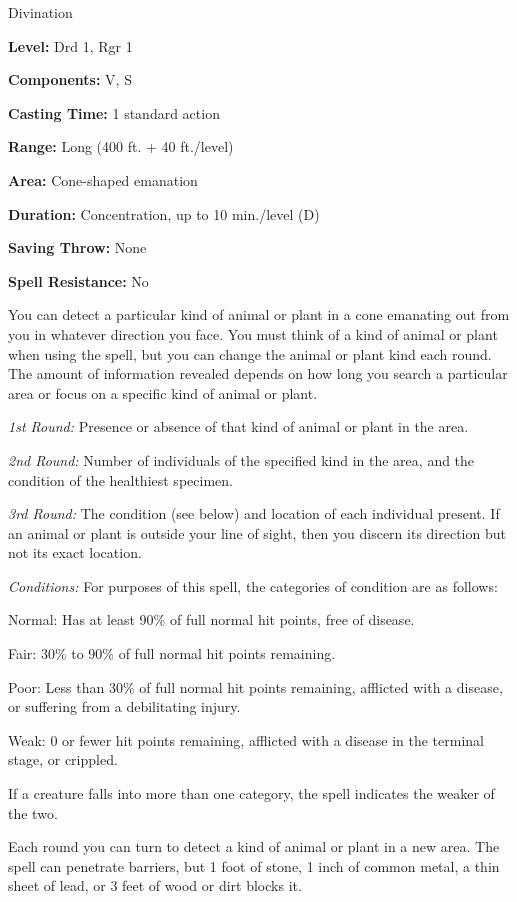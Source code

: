 
Divination

\textbf{Level:} Drd 1, Rgr 1

\textbf{Components:} V, S

\textbf{Casting Time:} 1 standard action

\textbf{Range:} Long (400 ft. + 40 ft./level)

\textbf{Area:} Cone-shaped emanation

\textbf{Duration:} Concentration, up to 10 min./level (D)

\textbf{Saving Throw:} None

\textbf{Spell Resistance:} No

You can detect a particular kind of animal or plant in a cone emanating out from 
you in whatever direction you face. You must think of a kind of animal or plant 
when using the spell, but you can change the animal or plant kind each round. The 
amount of information revealed depends on how long you search a particular area 
or focus on a specific kind of animal or plant.

\textit{1st Round:} Presence or absence of that kind of animal or plant in the 
area.

\textit{2nd Round:} Number of individuals of the specified kind in the area, and 
the condition of the healthiest specimen.

\textit{3rd Round:} The condition (see below) and location of each individual present. 
If an animal or plant is outside your line of sight, then you discern its direction 
but not its exact location.

\textit{Conditions:} For purposes of this spell, the categories of condition are 
as follows:

Normal: Has at least 90\% of full normal hit points, free of disease.

Fair: 30\% to 90\% of full normal hit points remaining.

Poor: Less than 30\% of full normal hit points remaining, afflicted with a disease, 
or suffering from a debilitating injury.

Weak: 0 or fewer hit points remaining, afflicted with a disease in the terminal 
stage, or crippled.

If a creature falls into more than one category, the spell indicates the weaker 
of the two.

Each round you can turn to detect a kind of animal or plant in a new area. The 
spell can penetrate barriers, but 1 foot of stone, 1 inch of common metal, a thin 
sheet of lead, or 3 feet of wood or dirt blocks it.


